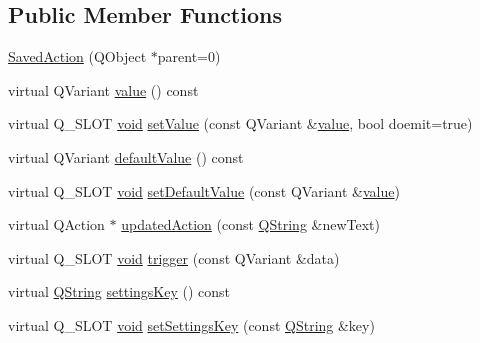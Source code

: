 \subsection*{\-Public \-Member \-Functions}
\begin{DoxyCompactItemize}
\item 
\hyperlink{class_utils_1_1_saved_action_ab15f15b12532741b7764d8fbee52562c}{\-Saved\-Action} (\-Q\-Object $\ast$parent=0)
\item 
virtual \-Q\-Variant \hyperlink{class_utils_1_1_saved_action_aed09984cf5a881b0988fb6702e968de3}{value} () const 
\item 
virtual \-Q\-\_\-\-S\-L\-O\-T \hyperlink{group___u_a_v_objects_plugin_ga444cf2ff3f0ecbe028adce838d373f5c}{void} \hyperlink{class_utils_1_1_saved_action_a0238473404fb4ac8ea3e934c0f188c5c}{set\-Value} (const \-Q\-Variant \&\hyperlink{class_utils_1_1_saved_action_aed09984cf5a881b0988fb6702e968de3}{value}, bool doemit=true)
\item 
virtual \-Q\-Variant \hyperlink{class_utils_1_1_saved_action_a46dfeb4d69f789f0bf09d18ed8d97497}{default\-Value} () const 
\item 
virtual \-Q\-\_\-\-S\-L\-O\-T \hyperlink{group___u_a_v_objects_plugin_ga444cf2ff3f0ecbe028adce838d373f5c}{void} \hyperlink{class_utils_1_1_saved_action_a1a746df3254216da19a2cd8a67f6966a}{set\-Default\-Value} (const \-Q\-Variant \&\hyperlink{class_utils_1_1_saved_action_aed09984cf5a881b0988fb6702e968de3}{value})
\item 
virtual \-Q\-Action $\ast$ \hyperlink{class_utils_1_1_saved_action_adb860d8816cd41a3236eaa1278e8a77b}{updated\-Action} (const \hyperlink{group___u_a_v_objects_plugin_gab9d252f49c333c94a72f97ce3105a32d}{\-Q\-String} \&new\-Text)
\item 
virtual \-Q\-\_\-\-S\-L\-O\-T \hyperlink{group___u_a_v_objects_plugin_ga444cf2ff3f0ecbe028adce838d373f5c}{void} \hyperlink{class_utils_1_1_saved_action_a2973d3383b69e819d53c2a814db60edf}{trigger} (const \-Q\-Variant \&data)
\item 
virtual \hyperlink{group___u_a_v_objects_plugin_gab9d252f49c333c94a72f97ce3105a32d}{\-Q\-String} \hyperlink{class_utils_1_1_saved_action_a0a22791e8b32f9fe1c624d5e8c87c2aa}{settings\-Key} () const 
\item 
virtual \-Q\-\_\-\-S\-L\-O\-T \hyperlink{group___u_a_v_objects_plugin_ga444cf2ff3f0ecbe028adce838d373f5c}{void} \hyperlink{class_utils_1_1_saved_action_ae953c28561478e670ba3a15b4bdb5d2c}{set\-Settings\-Key} (const \hyperlink{group___u_a_v_objects_plugin_gab9d252f49c333c94a72f97ce3105a32d}{\-Q\-String} \&key)

\end{DoxyCompactItemize}
